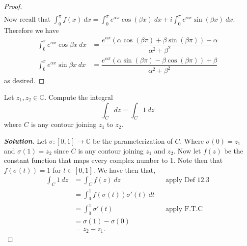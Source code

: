 \documentclass[11pt]{article}
\newenvironment{problem}[2][Problem\!]{\begin{trivlist}
\item[\hskip \labelsep {\bfseries #1}\hskip \labelsep {\bfseries #2}]}{\end{trivlist}}
\newenvironment{solution}{\begin{proof}[\textbf{\textit{Solution}}] }{\end{proof}}
\newcommand{\cc}{\mathbb C}   %
\newcommand{\lrp}[1]{\left(#1\right)}
\begin{document}
\begin{proof}
\begin{align*}
    \end{align*}
    Now recall that $\int_0^{\pi}f(x) \ dx = \int_0^{\pi}e^{\alpha x}\cos(\beta x) \ dx + i\int_0^{\pi} e^{\alpha x}\sin(\beta x)\ dx$. Therefore we have 
    \begin{align*}
        \int_0^\pi e^{\alpha x}\cos\beta x\ dx  &=  \dfrac{e^{\alpha \pi}\lrp{\alpha \cos(\beta \pi) +\beta \sin(\beta\pi) }-\alpha}{\alpha^{2}+ \beta^{2}}  \\
        \int_0^\pi e^{\alpha x}\sin\beta x\ dx &=  \dfrac{e^{\alpha \pi}\lrp{\alpha \sin(\beta \pi) -\beta\cos(\beta \pi)} + \beta}{\alpha^{2} + \beta^{2}}
    \end{align*}
    as desired.
\end{proof}

\newpage  %

\begin{problem}{6.3}
Let $z_1, z_2 \in \cc$. Compute the integral
\[\int_C dz = \int_C 1\,dz\]
where $C$ is any contour joining $z_1$ to $z_2$.
\end{problem}
\begin{solution}
    Let $\sigma:[0, 1] \to \cc$ be the parameterization of $C$. Where $\sigma(0) = z_1$ and $\sigma(1) = z_2$ since $C$ is any contour joining $z_1$ and $z_2$. Now let $f(z)$ be the constant function that maps every complex number to 1. Note then that $f(\sigma(t)) = 1$ for $t \in [0,1]$. We have then that,
    \begin{align*}
        \int_C 1\ dz &= \int_Cf(z) \ dz  && \text{apply Def 12.3} \\
        &= \int_0^{1}f(\sigma(t))\sigma'(t) \ dt \\
        &= \int_0^{1}\sigma'(t) && \text{apply F.T.C} \\
        &= \sigma(1) - \sigma(0) \\
        &= z_2 - z_1.
    \end{align*}
\end{solution}

\newpage  %
\end{document}
